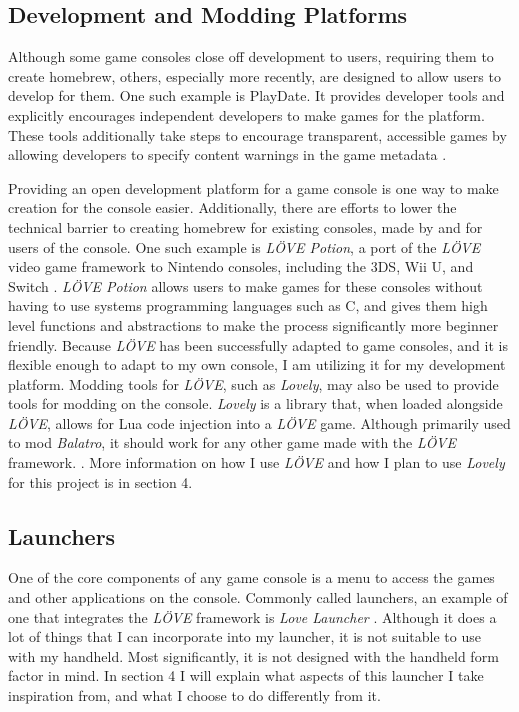 \documentclass[10pt,twocolumn]{article}
\begin{document}
\subsection{Development and Modding Platforms}

Although some game consoles close off development to users, requiring them to
create homebrew, others, especially more recently, are designed to allow users
to develop for them. One such example is PlayDate. It provides developer tools
and explicitly encourages independent developers to make games for the platform.
These tools additionally take steps to encourage transparent, accessible games
by allowing developers to specify content warnings in the game metadata
\cite{inc_inside_nodate}.

Providing an open development platform for a game console is one way to make
creation for the console easier. Additionally, there are efforts to lower the
technical barrier to creating homebrew for existing consoles, made by and for
users of the console.
One such example is \textit{LÖVE Potion}, a port of the \textit{LÖVE} video
game framework to Nintendo consoles, including the 3DS, Wii U, and Switch
\cite{noauthor_lovebrewlovepotion_2025}.
\textit{LÖVE Potion} allows users to make games
for these consoles without having to use systems programming languages such as
C, and gives them high level functions and abstractions to make the process
significantly more beginner friendly. Because \textit{LÖVE}
has been successfully adapted
to game consoles, and it is flexible enough to adapt to my own console, I am
utilizing it for my development platform. Modding tools for \textit{LÖVE},
such as
\textit{Lovely}, may also be used to provide tools for modding on the console.
\textit{Lovely} is a library that, when loaded alongside \textit{LÖVE},
allows for Lua code injection into a
\textit{LÖVE} game. Although primarily used to mod \textit{Balatro},
it should work for any other
game made with the \textit{LÖVE} framework.
\cite{green_ethangreen-devlovely-injector_2025}. More information on how I use
\textit{LÖVE} and how I plan to use \textit{Lovely} for this project
is in section 4.

\subsection{Launchers}

One of the core components of any game console is a menu to access the games and
other applications on the console. Commonly called launchers, an example of one
that integrates the \textit{LÖVE} framework is \textit{Love Launcher}
\cite{noauthor_glitchapplovelauncher_nodate}. Although it does a lot of things
that I can incorporate into my launcher, it is not suitable to use with
my handheld. Most significantly, it is not designed with the handheld form
factor in mind. In section 4 I will explain what aspects of this launcher I take
inspiration from, and what I choose to do differently from it.
\end{document}
